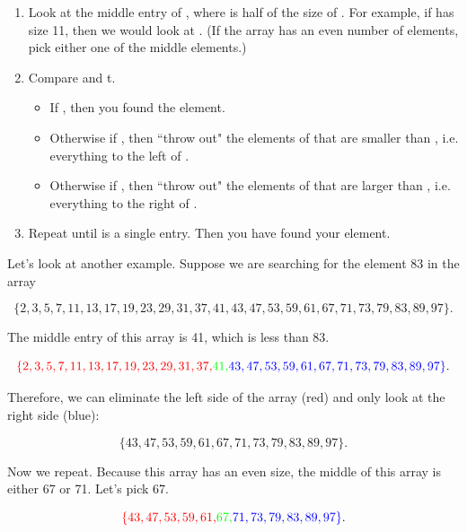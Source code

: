 \begin{enumerate}
    \item Look at the middle entry  of , where  is half of the size of . For example, if  has size 11, then we would look at . (If the array has an even number of elements, pick either one of the middle elements.)
    \item Compare  and t.
    \begin{itemize}
        \item If , then you found the element.
        \item Otherwise if , then ``throw out" the elements of  that are smaller than , i.e. everything to the left of .
        \item  Otherwise if , then ``throw out" the elements of  that are larger than , i.e. everything to the right of .
    \end{itemize}
    \item Repeat until  is a single entry. Then you have found your element.
\end{enumerate}

Let's look at another example. Suppose we are searching for the element 83 in the array

\begin{equation*}
    \{ 2, 3, 5, 7, 11, 13, 17, 19, 23, 29, 31, 37, 41, 43, 47, 53, 59, 61, 67, 71, 73, 79, 83, 89, 97   \}.
\end{equation*}

The middle entry of this array is 41, which is less than 83.

\begin{equation*}
    \textcolor{red}{\{ 2, 3, 5, 7, 11, 13, 17, 19, 23, 29, 31, 37,} \textcolor{green}{41,} \textcolor{blue}{43, 47, 53, 59, 61, 67, 71, 73, 79, 83, 89, 97   \}}.
\end{equation*}

Therefore, we can eliminate the left side of the array (red) and only look at the right side (blue):

\begin{equation*}
    \{43, 47, 53, 59, 61, 67, 71, 73, 79, 83, 89, 97\}.
\end{equation*}

Now we repeat. Because this array has an even size, the middle of this array is either 67 or 71. Let's pick 67.

\begin{equation*}
    \textcolor{red}{\{43, 47, 53, 59, 61,} \textcolor{green}{67,} \textcolor{blue}{71, 73, 79, 83, 89, 97   \}}.
\end{equation*}

